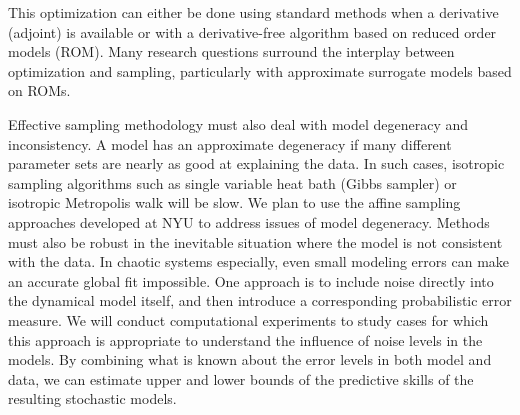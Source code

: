 \documentclass[11pt]{article}
\begin{document}
This optimization can either be done using standard methods when a derivative (adjoint) is available
or with a derivative-free algorithm based on reduced order models (ROM).
Many research questions surround the interplay between optimization and
sampling, particularly with approximate surrogate models based on ROMs.

Effective sampling methodology must also deal with model degeneracy and inconsistency.
A model has an approximate degeneracy if many different parameter sets are nearly as good at explaining the data.
In such cases, isotropic sampling algorithms such as single variable heat bath (Gibbs sampler) or isotropic
Metropolis walk will be slow. We plan to use the affine sampling approaches developed at NYU to address issues of model degeneracy.
Methods must also be robust in the inevitable situation where the model is not consistent with the
data.
In chaotic systems especially, even small modeling errors can make an accurate global fit impossible.
One approach is to include noise directly into the dynamical model
itself, and then introduce a corresponding probabilistic error measure. We will conduct computational experiments to study
cases for which this approach is appropriate to understand the
influence of noise levels in the models.
By combining what is known about the error levels in both model and data, we can estimate upper and lower bounds
of the predictive skills of the resulting stochastic models.
\end{document}
